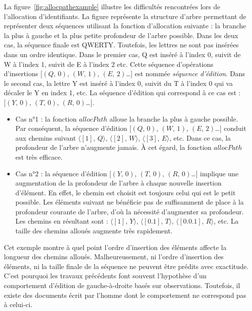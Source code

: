 La figure~\ref{fig:allocpathexample} illustre les difficultés rencontrées lors
de l'allocation d'identifiants. La figure représente la structure d'arbre
permettant de représenter deux séquences utilisant la fonction d'allocation
suivante : la branche la plus à gauche et la plus petite profondeur de l'arbre
possible. Dans les deux cas, la séquence finale est QWERTY. Toutefois, les
lettres ne sont pas insérées dans un ordre identique. Dans le premier cas, Q est
inséré à l'index 0, suivit de W à l'index 1, suivit de E à l'index 2 etc. Cette
séquence d'opérations d'insertions $[(Q,\,0)$, $(W,\,1)$, $(E,\,2)$\ldots$]$ est
nommée \emph{séquence d'édition}. Dans le second cas, la lettre Y est inséré à
l'index 0, suivit du T à l'index 0 qui va décaler le Y en index 1, etc. La
séquence d'édition qui correspond à ce cas est : $[(Y,\,0)$, $(T,\,0)$,
$(R,\,0)$\ldots$]$.
\begin{itemize}
\item Cas n°1 : la fonction $allocPath$ alloue la branche la plus à gauche
  possible. Par conséquent, la séquence d'édition $[(Q,\,0)$, $(W,\,1)$,
  $(E,\,2)$\ldots$]$ conduit aux chemins suivant $\langle [1],\,Q\rangle$,
  $\langle [2],\, W \rangle$, $\langle [3],\, E\rangle$, etc. Dans ce cas, la
  profondeur de l'arbre n'augmente jamais. À cet égard, la fonction $allocPath$
  est très efficace.
\item Cas n°2 : la séquence d'édition $[(Y,\,0)$, $(T,\,0)$, $(R,\,0)$\ldots$]$
  implique une augmentation de la profondeur de l'arbre à chaque nouvelle
  insertion d'élément. En effet, le chemin est choisit est toujours celui qui
  est le petit possible. Les éléments suivant ne bénéficie pas de suffisamment de
  place à la profondeur courante de l'arbre, d'où la nécessité d'augmenter sa
  profondeur. Les chemins en résultant sont : $\langle [1],\, Y\rangle$,
  $\langle[0.1],\,T\rangle$, $\langle[0.0.1],\, R\rangle$, etc. La taille des
  chemins alloués augmente très rapidement.
\end{itemize}

Cet exemple montre à quel point l'ordre d'insertion des éléments affecte la
longueur des chemins alloués. Malheureusement, ni l'ordre d'insertion des
éléments, ni la taille finale de la séquence ne peuvent être prédits avec
exactitude. C'est pourquoi les travaux précédents font souvent l'hypothèse d'un
comportement d'édition de gauche-à-droite basés sur observations. Toutefois, il
existe des documents écrit par l'homme dont le comportement ne correspond pas à
celui-ci.


